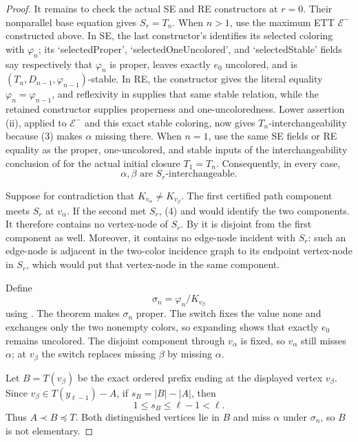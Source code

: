 \begin{proof}
It remains to check the actual SE and RE constructors at $r=0$.  Their
nonparallel base equation gives $S_r=T_n$.  When $n>1$, use the maximum
ETT $\mathcal E^{-}$ constructed above.  In SE, the last constructor's
 identifies its selected coloring with
$\varphi_n$; its `selectedProper', `selectedOneUncolored', and
`selectedStable' fields say respectively that $\varphi_n$ is proper,
leaves exactly $e_0$ uncolored, and is
$(T_n,D_{n-1},\varphi_{n-1})$-stable.  In RE, the constructor gives the
literal equality $\varphi_n=\varphi_{n-1}$, and reflexivity in
 supplies that same stable relation, while the retained
constructor supplies properness and one-uncoloredness.  Lower assertion
(ii), applied to $\mathcal E^{-}$ and this exact stable coloring, now
gives $T_n$-interchangeability because (3) makes $\alpha$ missing there.
When $n=1$, use the same SE fields or RE equality as the proper,
one-uncolored, and stable inputs of the interchangeability conclusion of
 for the actual initial closure $T_1=T_n$.
Consequently, in every case,
\[
        \alpha,\beta\text{ are }S_r\text{-interchangeable}.     \tag{4}
\]

Suppose for contradiction that $K_{v_\alpha}\ne K_{v_\beta}$.
The first certified path component meets $S_r$ at $v_\alpha$.  If the
second met $S_r$, (4) and  would identify
the two components.  It therefore contains no vertex-node of $S_r$.
By  it is disjoint from the first
component as well.  Moreover, it contains no edge-node incident with
$S_r$: such an edge-node is adjacent in the two-color incidence graph to
its endpoint vertex-node in $S_r$, which would put that vertex-node in
the same component.

Define
\[
              \sigma_n=\varphi_n/K_{v_\beta}
\]
using .  The theorem
 makes $\sigma_n$ proper.  The
switch fixes the value \textsf{none} and exchanges only the two nonempty
colors, so expanding  shows that exactly
$e_0$ remains uncolored.  The disjoint component through $v_\alpha$ is
fixed, so $v_\alpha$ still misses $\alpha$; at $v_\beta$ the switch
replaces missing $\beta$ by missing $\alpha$.

Let $B=T(v_\beta)$ be the exact ordered prefix ending at the displayed
vertex $v_\beta$.  Since $v_\beta\in T(y_{\ell-1})-A$, if
$s_B=|B|-|A|$, then
\[
                         1\leq s_B\leq\ell-1<\ell.             \tag{5}
\]
Thus $A\prec B\preccurlyeq T$.  Both distinguished vertices lie in
$B$ and miss $\alpha$ under $\sigma_n$, so $B$ is not elementary.


\end{proof}
